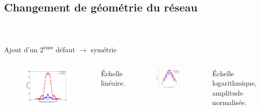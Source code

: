 \documentclass[12pt,xcolor=x11names,compress, notes=show]{beamer}%
\begin{document}
\subsection{Changement de géométrie du réseau}
\begin{frame}{\insertsectionhead}
\insertsubsectionhead\\~\\

Ajout d'un 2\textsuperscript{ème} défaut $\rightarrow$ symétrie
\vspace{-0.5cm}
\begin{columns}[T]
	\begin{figure}
		\centering
		\includegraphics[height=0.5\textheight]{comparaison_decroissance_lin.png}
	\end{figure}
	\centering
	\footnotesize{Échelle linéaire.}
	
	\begin{figure}
		\centering
		\includegraphics[height=0.5\textheight]{comparaison_decroissance_log_theo.png}
	\end{figure}
	\centering
	\footnotesize{Échelle logarithmique, amplitude normalisée.}
\end{columns}
\end{frame}
\end{document}
